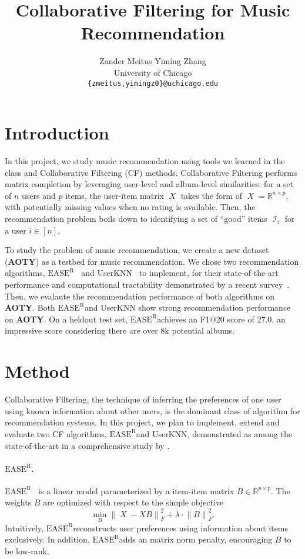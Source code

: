 \documentclass{article}
\title{Collaborative Filtering for Music Recommendation}
\author{
  Zander Meitus \qquad Yiming Zhang \\
  University of Chicago \\
  \texttt{\{zmeitus,yimingz0\}@uchicago.edu}
}
\newcommand{\aoty}{{\bf AOTY}\xspace}
\DeclareMathOperator{\X}{\mathit{X}}
\DeclareMathOperator{\I}{\mathcal{I}}
\newcommand{\easer}{$\text{EASE}^\text{R}$}
\newcommand{\userknn}{UserKNN\xspace}
\newcommand{\norm}[1]{\ensuremath{\lVert #1 \rVert}}
\begin{document}
\maketitle

\section{Introduction}

In this project, we study music recommendation using tools we learned in the
 class and Collaborative Filtering (CF) methods.
Collaborative Filtering performs matrix completion by leveraging user-level and
 album-level similarities: for a set of $n$ users and $p$ items, the user-item
 matrix $\X$ takes the form of $\X = \mathbb{R}^{n \times p}$, with potentially
 missing values when no rating is available.
Then, the recommendation problem boils down to identifying a set of ``good''
 items $\I_i$ for a user $i \in [n]$.

To study the problem of music recommendation, we create a new dataset (\aoty)
 as a testbed for music recommendation.
We chose two recommendation algorithms,
 \easer~\citep{steckEmbarrassinglyShallowAutoencoders2019} and
 \userknn~\citep{resnickGroupLensOpenArchitecture1994} to implement, for their
 state-of-the-art performance and computational tractability demonstrated by a
 recent survey~\citep{anelliTopNRecommendationAlgorithms2022}.
Then, we evalaute the recommendation performance of both algorithms on \aoty.
Both \easer and \userknn show strong recommendation performance on \aoty.
On a heldout test set, \easer achieves an F1@20 score of 27.0, an impressive
 score considering there are over 8k potential albums.

\section{Method}
Collaborative Filtering, the technique of inferring the preferences of one user
 using known information about other users, is the dominant class of algorithm
 for recommendation systems.
In this project, we plan to implement, extend and evaluate two CF algorithms,
 \easer and \userknn, demonstrated as among the state-of-the-art in a
 comprehensive study by \citet{anelliTopNRecommendationAlgorithms2022}.

\paragraph*{\easer.}
\easer~\citep{steckEmbarrassinglyShallowAutoencoders2019}
is a linear model parameterized by a item-item matrix $B \in
	\mathbb{R}^{p \times p}$.
The weights $B$ are optimized with respect to the simple objective
 \begin{equation} \min_B \norm{\X - X B}_F^2 + \lambda \cdot \norm{B}_F^2
 \text{.
}
\end{equation}
Intuitively, \easer reconstructs user preferences using information about items
 exclusively.
In addition, \easer adds an matrix norm penalty, encouraging $B$ to be
 low-rank.
\end{document}
